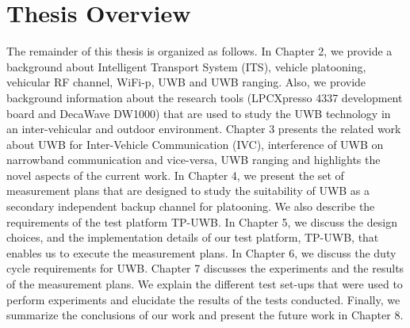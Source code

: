 \section{Thesis Overview}
The remainder of this thesis is organized as follows. In Chapter 2, we provide a background about Intelligent Transport System (ITS), vehicle platooning, vehicular RF channel, WiFi-p, UWB and UWB ranging.
Also, we provide background information about the research tools (LPCXpresso 4337 development board and DecaWave DW1000) that are used to study the UWB technology in an inter-vehicular and outdoor environment. Chapter 3 presents the related work about UWB for Inter-Vehicle Communication (IVC), interference of UWB on narrowband communication and vice-versa, UWB ranging and highlights the novel aspects of the current work. In Chapter 4, we present the set of measurement plans that are designed to study the suitability of UWB as a secondary independent backup channel for platooning. We also describe the requirements of the test platform TP-UWB. In Chapter 5, we discuss the design choices, and the implementation details of our test platform, TP-UWB, that enables us to execute the measurement plans. In Chapter 6, we discuss the duty cycle requirements for UWB. Chapter 7 discusses the experiments and the results of the measurement plans. We explain the different test set-ups that were used to perform experiments and elucidate the results of the tests conducted. Finally, we summarize the conclusions of our work and present the future work in Chapter 8.

